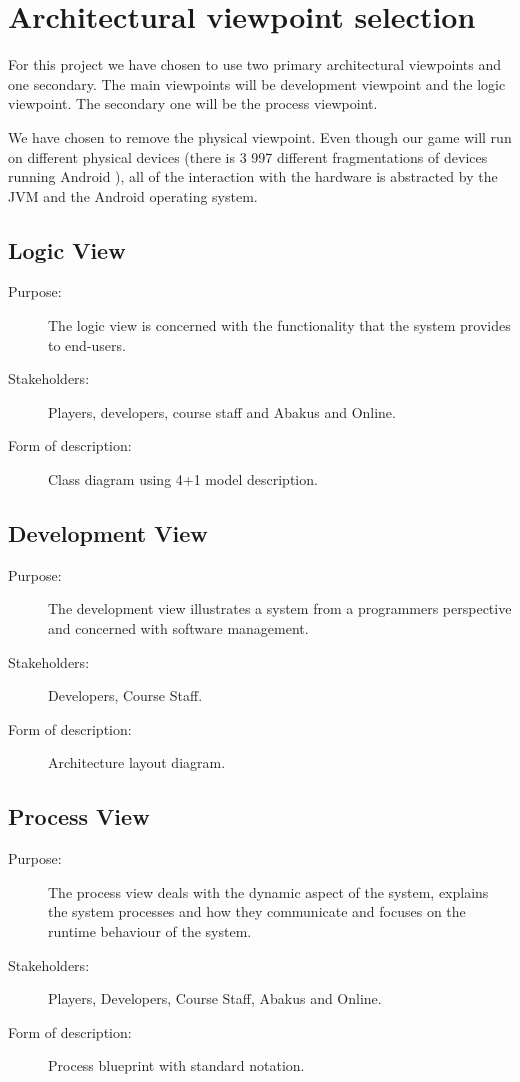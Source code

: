 \section{Architectural viewpoint selection} 
\label{architecturalviewpointselection}

For this project we have chosen to use two primary architectural viewpoints and one secondary. 
The main viewpoints will be development viewpoint and the logic viewpoint. The secondary one will be the process viewpoint.

We have chosen to remove the physical viewpoint. Even though our game will run on different physical devices (there is 3 997 different fragmentations of devices running Android \cite{website:androidfragmentations}), all of the interaction with the hardware is abstracted by the JVM and the Android operating system.

\subsection{Logic View}
\begin{description}
	\item[Purpose:]{The logic view is concerned with the functionality that the system provides to end-users.}
	\item[Stakeholders:]{Players, developers, course staff and Abakus and Online.}
	\item[Form of description:]{Class diagram using 4+1 model description.}
\end{description}


\subsection{Development View}
\begin{description}
	\item[Purpose:]{The development view illustrates a system from a programmers perspective and concerned with software management.}
	\item[Stakeholders:]{Developers, Course Staff.}
	\item[Form of description:]{Architecture layout diagram.}
\end{description}

\subsection{Process View}
\begin{description}
	\item[Purpose:]{The process view deals with the dynamic aspect of the system, explains the system processes and how they communicate and focuses on the runtime behaviour of the system.}
	\item[Stakeholders:]{Players, Developers, Course Staff, Abakus and Online.}
	\item[Form of description:]{Process blueprint with standard notation.}
\end{description}